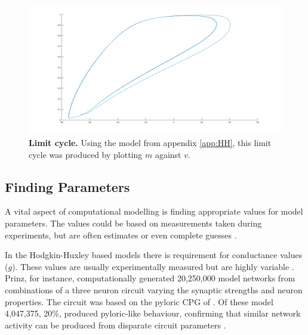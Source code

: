 \begin{figure}[H]
	\centering
		\includegraphics[width=\columnwidth]{graphics/limitcycle.png}
		\caption[Limit cycle]{\textbf{Limit cycle.} Using the model from appendix \ref{app:HH}, this limit cycle was produced by plotting $m$ against $v$.}
		\label{fig:limitcycle}
\end{figure}

\subsection{Finding Parameters}
A vital aspect of computational modelling is finding appropriate values for model parameters. The values could be based on measurements taken during experiments, but are often estimates or even complete guesses \cite{Sterratt2011}.

In the Hodgkin-Huxley based models there is requirement for conductance values ($g$). These values are usually experimentally measured but are highly variable \cite{Golowasch1999,Zhao2012}. Prinz, for instance, computationally generated 20,250,000 model networks from combinations of a three neuron circuit varying the synaptic strengths and neuron properties. The circuit was based on the pyloric \ac{CPG} of . Of these model  4,047,375, 20\%, produced pyloric-like behaviour, confirming that similar network activity can be produced from disparate circuit parameters \cite{Prinz2004a}.

